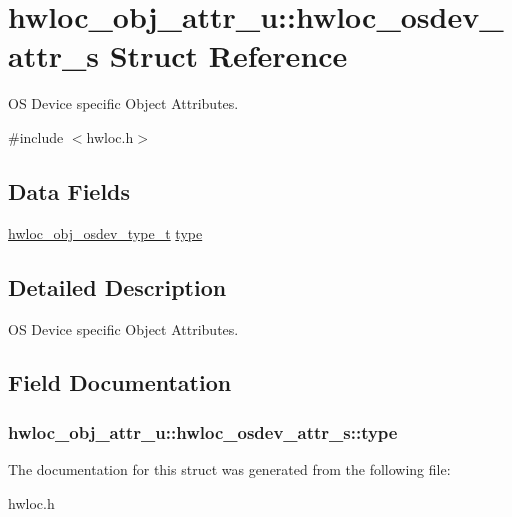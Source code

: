 \hypertarget{a00021}{
\section{hwloc\_\-obj\_\-attr\_\-u::hwloc\_\-osdev\_\-attr\_\-s Struct Reference}
\label{a00021}
}


OS Device specific Object Attributes.  




{\ttfamily \#include $<$hwloc.h$>$}

\subsection*{Data Fields}
\begin{DoxyCompactItemize}
\item 
\hyperlink{a00041_ga90c1e82a60ba5871d07645169e636987}{hwloc\_\-obj\_\-osdev\_\-type\_\-t} \hyperlink{a00021_a31e019e27e54ac6138d04be639bb96f9}{type}
\end{DoxyCompactItemize}


\subsection{Detailed Description}
OS Device specific Object Attributes. 

\subsection{Field Documentation}
\hypertarget{a00021_a31e019e27e54ac6138d04be639bb96f9}{
\subsubsection[{type}]{ {\bf hwloc\_\-obj\_\-attr\_\-u::hwloc\_\-osdev\_\-attr\_\-s::type}}}
\label{a00021_a31e019e27e54ac6138d04be639bb96f9}


The documentation for this struct was generated from the following file:\begin{DoxyCompactItemize}
\item 
hwloc.h\end{DoxyCompactItemize}

